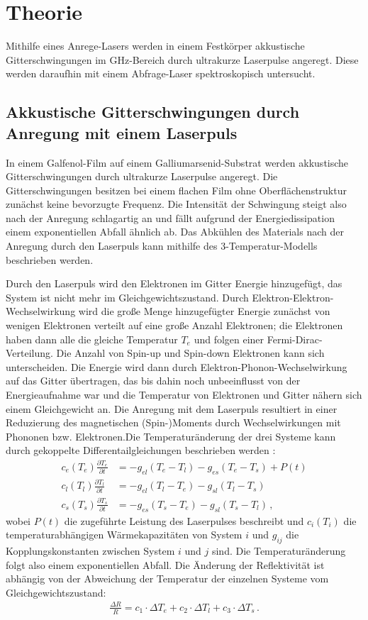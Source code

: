 \section{Theorie}

Mithilfe eines Anrege-Lasers werden in einem Festkörper akkustische Gitterschwingungen im GHz-Bereich durch ultrakurze Laserpulse angeregt. Diese werden daraufhin mit einem Abfrage-Laser spektroskopisch untersucht.

\subsection{Akkustische Gitterschwingungen durch Anregung mit einem Laserpuls}

In einem Galfenol-Film auf einem Galliumarsenid-Substrat werden akkustische Gitterschwingungen durch ultrakurze Laserpulse angeregt. Die Gitterschwingungen besitzen bei einem flachen Film ohne Oberflächenstruktur zunächst keine bevorzugte Frequenz. Die Intensität der Schwingung steigt also nach der Anregung schlagartig an und fällt aufgrund der Energiedissipation einem exponentiellen Abfall ähnlich ab. Das Abkühlen des Materials nach der Anregung durch den Laserpuls kann mithilfe des 3-Temperatur-Modells beschrieben werden.\par
Durch den Laserpuls wird den Elektronen im Gitter Energie hinzugefügt, das System ist nicht mehr im Gleichgewichtszustand. Durch Elektron-Elektron-Wechselwirkung wird die große Menge hinzugefügter Energie zunächst von wenigen Elektronen verteilt auf eine große Anzahl Elektronen; die Elektronen haben dann alle die gleiche Temperatur $T_e$ und folgen einer Fermi-Dirac-Verteilung. Die Anzahl von Spin-up und Spin-down Elektronen kann sich unterscheiden. Die Energie wird dann durch Elektron-Phonon-Wechselwirkung auf das Gitter übertragen, das bis dahin noch unbeeinflusst von der Energieaufnahme war und die Temperatur von Elektronen und Gitter nähern sich einem Gleichgewicht an. Die Anregung mit dem Laserpuls resultiert in einer Reduzierung des magnetischen (Spin-)Moments durch Wechselwirkungen mit Phononen bzw. Elektronen.Die Temperaturänderung der drei Systeme kann durch gekoppelte Differentailgleichungen beschrieben werden \cites{3TM-1, 3TM-2}:
\begin{align}
  c_e(T_e)\frac{\partial T_e}{\partial t} &= -g_{el} (T_e - T_l) - g_{es}(T_e - T_s) + P(t)\\
  c_l(T_l)\frac{\partial T_l}{\partial t} &= -g_{el} (T_l - T_e) - g_{sl}(T_l - T_s)\\
  c_s(T_s)\frac{\partial T_s}{\partial t} &= -g_{es} (T_s - T_e) - g_{sl}(T_s - T_l) \, ,
\end{align}
wobei $P(t)$ die zugeführte Leistung des Laserpulses beschreibt und $c_i(T_i)$ die temperaturabhängigen Wärmekapazitäten von System $i$ und $g_{ij}$ die Kopplungskonstanten zwischen System $i$ und $j$ sind. Die Temperaturänderung folgt also einem exponentiellen Abfall. Die Änderung der Reflektivität ist abhängig von der Abweichung der Temperatur der einzelnen Systeme vom Gleichgewichtszustand:
\begin{align}
  \frac{\Delta R}{R} = c_1 \cdot \Delta T_e + c_2 \cdot \Delta T_l + c_3 \cdot \Delta T_s \, .
\end{align}

